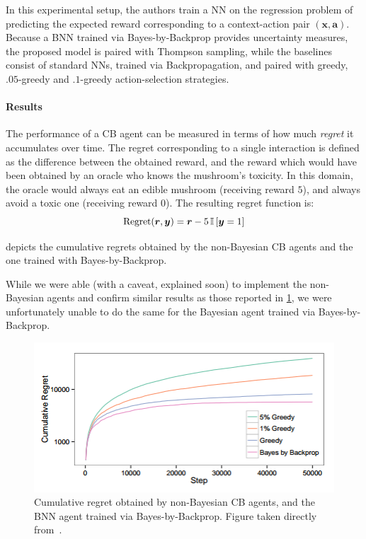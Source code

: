 \documentclass[11pt]{article}
\begin{document}
In this experimental setup, the authors train a NN on the regression problem of
predicting the expected reward corresponding to a context-action pair $(\bm x,
\bm a)$.  
Because a BNN trained via Bayes-by-Backprop provides
uncertainty measures, the proposed model is paired with Thompson sampling,
while the baselines consist of standard NNs, trained via Backpropagation, and
paired with greedy, $.05$-greedy and $.1$-greedy action-selection strategies.


\paragraph{Results} 

The performance of a CB agent can be measured in terms of how much
\emph{regret} it accumulates over time.  The regret corresponding to a single
interaction is defined as the difference between the obtained reward, and the
reward which would have been obtained by an oracle who knows the mushroom's
toxicity.  In this domain, the oracle would always eat an edible mushroom
(receiving reward $5$), and always avoid a toxic one (receiving reward $0$).
The resulting regret function is:
%
\begin{equation}
  \operatorname{Regret}(\bm r, \bm y) = \bm r - 5 \, {\mathbb{I}}\left[ \bm
  y = 1 \right]
\end{equation}

 depicts the cumulative regrets obtained by the
non-Bayesian CB agents and the one trained with Bayes-by-Backprop.  

While we were able (with a caveat, explained soon) to implement the
non-Bayesian agents and confirm similar results as those reported in
\cref{fig:cb_cumregret}, we were unfortunately unable to do the same for the
Bayesian agent trained via Bayes-by-Backprop.



\begin{figure}
  \centering\includegraphics[width=.5\textwidth]{figures/cb_cumregret.png}
  \caption{Cumulative regret obtained by non-Bayesian CB agents, and the BNN
  agent trained via Bayes-by-Backprop.  Figure taken directly
  from~\cite{blundell}.}\label{fig:cb_cumregret}
\end{figure}
\end{document}
